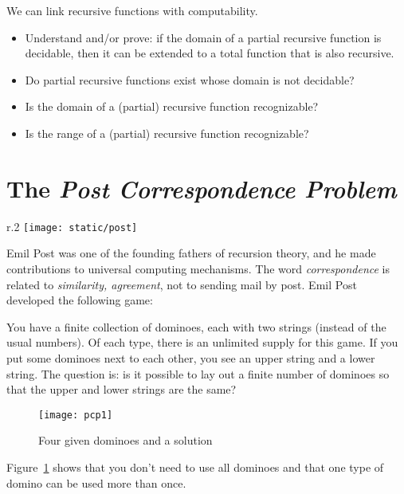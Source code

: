 \begin{exercise}
We can link recursive functions with computability.
\begin{itemize}
\item
Understand and/or prove: if the domain of a partial recursive function
is decidable, then it can be extended to a total function that is also
recursive.
\item
Do partial recursive functions exist whose domain is not decidable?
\item
Is the domain of a (partial) recursive function recognizable?
\item
Is the range of a (partial) recursive function recognizable?
\end{itemize}
\end{exercise}


\section{The {\em Post Correspondence Problem}}

\begingroup
\begin{wrapfigure}[9]{r}{.2\textwidth}
\texttt{[image: static/post]}
\end{wrapfigure}

Emil Post was one of the founding fathers of recursion theory, and he
made contributions to universal computing mechanisms. The word {\em
  correspondence} is related to {\em similarity, agreement}, not to
sending mail by post. Emil Post developed the following game:

You have a finite collection of dominoes, each with two strings
(instead of the usual numbers). Of each type, there is an unlimited
supply for this game. If you put some dominoes next to each other, you
see an upper string and a lower string. The question is: is it
possible to lay out a finite number of dominoes so that the upper and
lower strings are the same?

\endgroup

\begin{figure}[h]
	\centering
	\texttt{[image: pcp1]}
	\caption{Four given dominoes and a solution\label{pcp1}}
\end{figure}

Figure~\ref{pcp1} shows that you don't need to use all dominoes and
that one type of domino can be used more than once.

